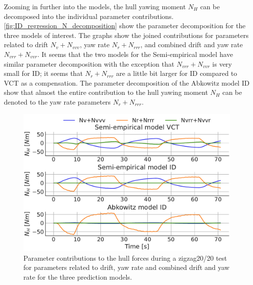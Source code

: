 Zooming in further into the models, the hull yawing moment $N_H$ can be decomposed into the individual parameter contributions. \autoref{fig:ID_regression_N_decomposition} show the parameter decomposition for the three models of interest. The graphs show the joined contributions for parameters related to drift $N_v+N_{vvv}$, yaw rate $N_r+N_{rrr}$, and combined drift and yaw rate $N_{vrr}+N_{vvr}$. It seems that the two models for the Semi-empirical model have similar parameter decomposition with the exception that $N_{vrr}+N_{vvr}$ is very small for ID; it seems that $N_r+N_{rrr}$ are a little bit larger for ID compared to VCT as a compensation.
The parameter decomposition of the Abkowitz model ID show that almost the entire contribution to the hull yawing moment $N_H$ can be denoted to the yaw rate parameters $N_r+N_{rrr}$. 
\begin{figure}[h!]
    \includegraphics[width=\columnwidth]{figures/result_ID_regression.ID_regression_N_decomposition.pdf}
    \caption{Parameter contributions to the hull forces during a zigzag20/20 test for parameters related to drift, yaw rate and combined drift and yaw rate for the three prediction models.}
    \label{fig:ID_regression_N_decomposition}
\end{figure}